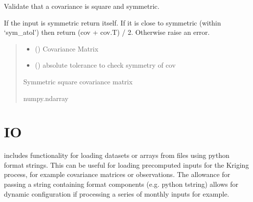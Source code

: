\documentclass[letterpaper,10pt,english]{sphinxmanual}
\begin{document}

\begin{fulllineitems}
\label{\detokenize{misc:glomar_gridding.covariance_tools.validate_covariance}}
\pysigstartsignatures
\pysiglinewithargsret
{}
{\sphinxparamcomma {}}
{}
\pysigstopsignatures
\sphinxAtStartPar
Validate that a covariance is square and symmetric.

\sphinxAtStartPar
If the input is symmetric return itself. If it is close to symmetric (within
‘sym\_atol’) then return (cov + cov.T) / 2. Otherwise raise an error.
\begin{quote}\begin{description}
\begin{itemize}
\item {}
\sphinxAtStartPar
{} () \textendash{} Covariance Matrix

\item {}
\sphinxAtStartPar
{} () \textendash{} absolute tolerance to check symmetry of cov

\end{itemize}

\sphinxAtStartPar
{} \textendash{} Symmetric square covariance matrix

\sphinxAtStartPar
numpy.ndarray

\end{description}\end{quote}

\end{fulllineitems}



\section{IO}
\label{\detokenize{misc:module-glomar_gridding.io}}\label{\detokenize{misc:io}}
\sphinxAtStartPar
{} includes functionality for loading datasets or arrays from
 files using python format strings. This can be useful for loading
pre\sphinxhyphen{}computed inputs for the Kriging process, for example covariance matrices or
observations. The allowance for passing a string containing format components
(e.g. python t\sphinxhyphen{}string) allows for dynamic configuration if processing a series
of monthly inputs for example.
\end{document}
